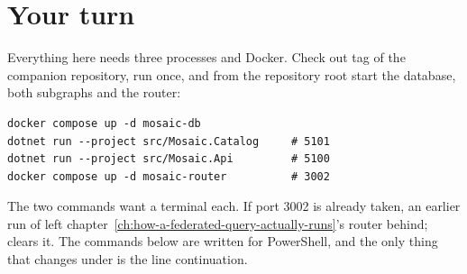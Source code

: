 \section*{Your turn}

Everything here needs three processes and Docker. Check out tag  of
the companion repository, run  once, and from the repository root
start the database, both subgraphs and the router:

\begin{verbatim}
docker compose up -d mosaic-db
dotnet run --project src/Mosaic.Catalog     # 5101
dotnet run --project src/Mosaic.Api         # 5100
docker compose up -d mosaic-router          # 3002
\end{verbatim}

The two  commands want a terminal each. If port 3002 is
already taken, an earlier run of  left
chapter~\ref{ch:how-a-federated-query-actually-runs}'s router behind;
 clears it. The commands below are
written for PowerShell, and the only thing that changes under  is the
line continuation.

